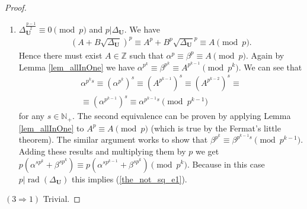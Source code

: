 \documentclass[preprint,12pt]{elsarticle}
\newcommand{\N}{\mathbb{N}}
\newcommand{\Z}{\mathbb{Z}}
\DeclareMathOperator{\rad}{rad}
\begin{document}
\begin{proof}
\begin{enumerate}
    \item $\Delta_\mathbf{U}^\frac{p-1}{2} \equiv 0 \pmod p$ and $p|\Delta_\mathbf{U}$. We have
     \begin{align}
         \left(A+B\sqrt{\Delta_{\mathbf U}}\right)^p \equiv
         A^p + B^p\sqrt{\Delta_{\mathbf U}}^p \equiv
         A
         \pmod{p}.
    \end{align}
    Hence there must exist $A\in\Z$ such that $\alpha^p\equiv\beta^p\equiv A\pmod p$. Again by Lemma \ref{lem_allInOne} we have $\alpha^{p^k}\equiv\beta^{p^k}\equiv A^{p^{k-1}}\pmod {p^k}$. We can see that
    \begin{align}
        \alpha^{p^ks} \equiv  
        \left(   \alpha^{p^k} \right)^s  \equiv 
         \left( A^{p^{k-1}}\right)^s  \equiv
         \left( A^{p^{k-2}}\right)^s  \equiv
         \\\equiv
         \left(\alpha^{p^{k-1}}\right)^s  \equiv
          \alpha^{p^{k-1}s} \pmod {p^{k-1}}
    \end{align}
    for any $s\in\N_+$. The second equivalence can be proven by applying Lemma \ref{lem_allInOne} to $A^p\equiv A\pmod p$ (which is true by the Fermat's little theorem). The similar argument works to show that  $\beta^{p^k} \equiv   \beta^{p^{k-1}s} \pmod {p^{k-1}}$. Adding these results and multiplying them by $p$ we get  $ p\left(\alpha^{sp^k}+\beta^{sp^k}\right) \equiv  p\left(\alpha^{sp^{k-1}}+\beta^{sp^k}\right) \pmod {p^k}$. Because in this case $p|\rad(\Delta_\mathbf{U})$ this implies (\ref{the_not_sq_e1}). 

\end{enumerate}


   


    
    

    
    


    \noindent $(3\Rightarrow1)$ Trivial.
\end{proof}
\end{document}
